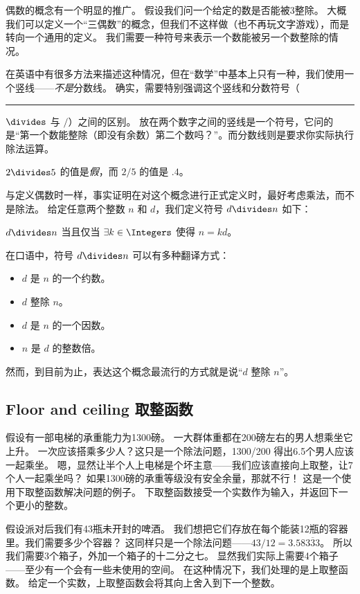 偶数的概念有一个明显的推广。
假设我们问一个给定的数是否能被3整除。
大概我们可以定义一个“三偶数”的概念，但我们不这样做（也不再玩文字游戏），而是转向一个通用的定义。
我们需要一种符号来表示一个数能被另一个数整除的情况。

在英语中有很多方法来描述这种情况，但在“数学”中基本上只有一种，我们使用一个竖线——{\em 不是}分数线。
确实，需要特别强调这个竖线和分数符号（\rule{3pt}{0pt}$\divides$ 与 $/$）之间的区别。
放在两个数字之间的竖线是一个符号，它问的是“第一个数能整除（即没有余数）第二个数吗？”。而分数线则是要求你实际执行除法运算。

$2\divides 5$ 的值是{\em 假}，而 $2/5$ 的值是 $.4$。

与定义偶数时一样，事实证明在对这个概念进行正式定义时，最好考虑乘法，而不是除法。
给定任意两个整数 $n$ 和 $d$，我们定义符号 $d\divides n$ 如下：

\begin{defi}
  $ d \divides n$ 当且仅当 $\exists k \in \Integers$ 使得 $n = kd$。
\end{defi}

在口语中，符号 $d \divides n$ 可以有多种翻译方式：

\begin{itemize}
  \item 
        $d$ 是 $n$ 的一个约数。
  \item 
        $d$ 整除 $n$。
  \item 
        $d$ 是 $n$ 的一个因数。
  \item 
        $n$ 是 $d$ 的整数倍。
\end{itemize}

然而，到目前为止，表达这个概念最流行的方式就是说“$d$ 整除 $n$”。

\subsection{Floor and ceiling 取整函数}
\label{floor}

假设有一部电梯的承重能力为1300磅。
一大群体重都在200磅左右的男人想乘坐它上升。
一次应该搭乘多少人？这只是一个除法问题，1300/200 得出6.5个男人应该一起乘坐。
嗯，显然让半个人上电梯是个坏主意——我们应该直接向上取整，让7个人一起乘坐吗？
如果1300磅的承重等级没有安全余量，那就不行！
这是一个使用下取整函数解决问题的例子。
下取整函数接受一个实数作为输入，并返回下一个更小的整数。

假设派对后我们有43瓶未开封的啤酒。
我们想把它们存放在每个能装12瓶的容器里。我们需要多少个容器？
这同样只是一个除法问题——$43/12 = 3.58\overline{333}$。
所以我们需要3个箱子，外加一个箱子的十二分之七。
显然我们实际上需要4个箱子——至少有一个会有一些未使用的空间。
在这种情况下，我们处理的是上取整函数。
给定一个实数，上取整函数会将其向上舍入到下一个整数。

